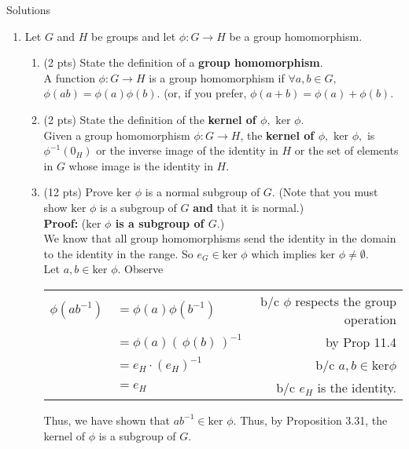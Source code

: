 \documentclass[12pt]{article}
\renewcommand{\emph}[1]{\textsf{\textbf{#1}}}
\begin{document}
\quad
Solutions \\

\begin{enumerate}
\item Let $G$ and $H$ be groups and let $\phi: G \to H$ be a group homomorphism.
	\begin{enumerate}
	\item (2 pts) State the definition of a \emph{group homomorphism}.\\
	
	A function $\phi: G \to H$ is a group homomorphism if $\forall a,b \in G,$
	 $\phi(ab)=\phi (a) \phi(b).$ (or, if you prefer, $\phi(a+b)=\phi (a) + \phi(b).$ \\
	\vfill
	\item (2 pts) State the definition of the \emph{kernel of $\phi,$} $\text{ker } \phi.$ \\
	
	
	Given a group homomorphism $\phi: G \to H$, the \emph{kernel of $\phi,$} $\text{ker } \phi,$ is $\phi^{-1}(0_H)$ or the inverse image of the identity in $H$ or the set of elements in $G$ whose image is the identity in $H.$\\
	
	\item (12 pts) Prove $\text{ker }\phi$ is a normal subgroup of $G.$ (Note that you must show $\text{ker }\phi$ is a subgroup of $G$ \emph{and} that it is normal.)\\
	
	\textbf{Proof:} (\textbf{$\text{ker }\phi$ is a subgroup of $G.$})\\
	We know that all group  homomorphisms send the identity in the domain to the identity in the range. So $e_G \in \text{ker }\phi$ which implies  $\text{ker }\phi \not = \emptyset.$\\
	Let $a,b \in \text{ker }\phi.$ Observe \\
	\begin{tabular}{rlr}
	$\phi(ab^{-1})$&$=\phi(a)\phi(b^{-1})$& b/c $\phi$ respects the group operation\\
	&$=\phi(a)( \, \phi(b)\,)^{-1}$& by Prop 11.4\\
	&$=e_H\cdot (e_H)^{-1}$& b/c $a,b \in \text{ker}\phi$\\
	&$=e_H$& b/c $e_H$ is the identity.\\
	\end{tabular}
	
	Thus, we have shown that $ab^{-1} \in \text{ker }\phi.$ Thus, by Proposition 3.31, the kernel of $\phi$ is a subgroup of $G.$
	

\end{enumerate}
\end{enumerate}
\end{document}
